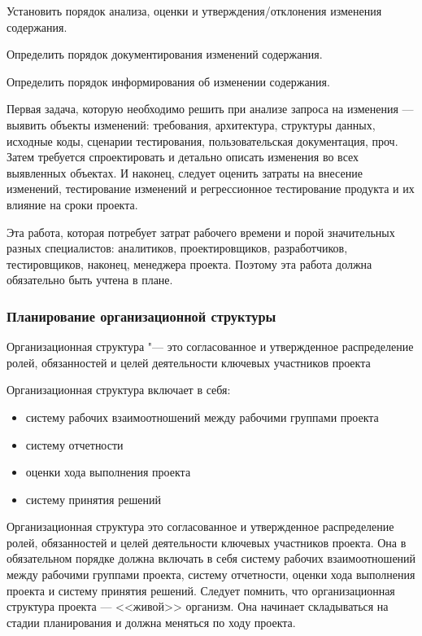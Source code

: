 \documentclass{../industrial-development}
\begin{document}
Установить порядок анализа, оценки и утверждения/отклонения изменения содержания.

Определить порядок документирования изменений содержания.

Определить порядок информирования об изменении содержания.

Первая задача, которую необходимо решить при анализе запроса на изменения — выявить объекты изменений: требования, архитектура, структуры данных, исходные коды, сценарии тестирования, пользовательская документация, проч. Затем требуется спроектировать и детально описать изменения во всех выявленных объектах. И наконец, следует оценить затраты на внесение изменений, тестирование изменений и регрессионное тестирование продукта и их влияние на сроки проекта.

Эта работа, которая потребует затрат рабочего времени и порой значительных разных специалистов: аналитиков, проектировщиков, разработчиков, тестировщиков, наконец, менеджера проекта. Поэтому эта работа должна обязательно быть учтена в плане.

    \begin{frame} \frametitle{Планирование организационной структуры}
        \begin{definition}
            \alert{Организационная структура} "--- это согласованное и утвержденное распределение ролей, обязанностей и целей деятельности ключевых участников проекта
        \end{definition}
        Организационная структура включает в себя:
        \begin{itemize}
            \item систему рабочих взаимоотношений между рабочими группами проекта
            \item систему отчетности
            \item оценки хода выполнения проекта
            \item систему принятия решений
        \end{itemize}
    \end{frame}
    \lecturenotes
    Организационная структура это согласованное и утвержденное распределение ролей, обязанностей и целей деятельности ключевых участников проекта. Она в обязательном порядке должна включать в себя систему рабочих взаимоотношений между рабочими группами проекта, систему отчетности, оценки хода выполнения проекта и систему принятия решений. Следует помнить, что организационная структура проекта — <<живой>> организм. Она начинает складываться на стадии планирования и должна меняться по ходу проекта.
\end{document}
